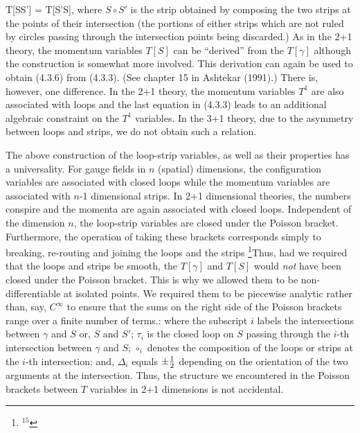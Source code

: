 T[S\circ S'] = T[S'\circ S],
where $S\circ S'$ is the strip obtained by composing the two strips at
the points of their intersection (the portions of either strips which
are not ruled by circles passing through the intersection points being
discarded.) As in the 2+1 theory, the momentum variables $T[S]$ can be
``derived'' from the $T[\gamma ]$ although the construction is somewhat
more involved. This derivation can again be used to obtain (4.3.6) from
(4.3.3). (See chapter 15 in Ashtekar (1991).)
There is, however, one difference. In the 2+1 theory, the momentum
variables $T^1$ are also associated with loops and the last equation in
(4.3.3) leads to an additional algebraic constraint on the $T^1$ variables.
In the 3+1 theory, due to the asymmetry between loops and strips, we do not
obtain such a relation.

The above construction of the loop-strip variables, as well as their
properties has a universality. For gauge fields in $n$ (spatial) dimensions,
the configuration variables are associated with closed loops while
the momentum variables are associated with $n$-1 dimensional strips.
In 2+1 dimensional theories, the numbers conspire and the momenta are again
associated with closed loops. Independent of the dimension $n$, the
loop-strip variables are closed under the Poisson bracket. Furthermore,
the operation of taking these brackets corresponds simply to breaking,
re-routing and joining the loops and the strips%
\footnote{$^{15}$}{Thus, had we required that the loops and strips be smooth, the
$T[\gamma ]$ and $T[S]$ would {\it not} have been closed under the Poisson
bracket. This is why we allowed them to be non-differentiable at isolated
points. We required them to be piecewise analytic rather than, say,
$C^\infty$ to ensure that the sums on the right side of the Poisson brackets
range over a finite number of terms.}:
where the subscript $i$ labels the intersections between $\gamma$ and $S$
or, $S$ and $S'$; $\tau_i$ is the closed loop on $S$ passing through the
$i$-th intersection between $\gamma$ and $S$; $\circ_i$ denotes the
composition of the loops or strips at the $i$-th intersection; and,
$\Delta_i$ equals $\pm {1\over 2}$ depending on the orientation of the two
arguments at the intersection. Thus, the structure we encountered in the
Poisson brackets between $T$ variables in 2+1 dimensions is not
accidental.

